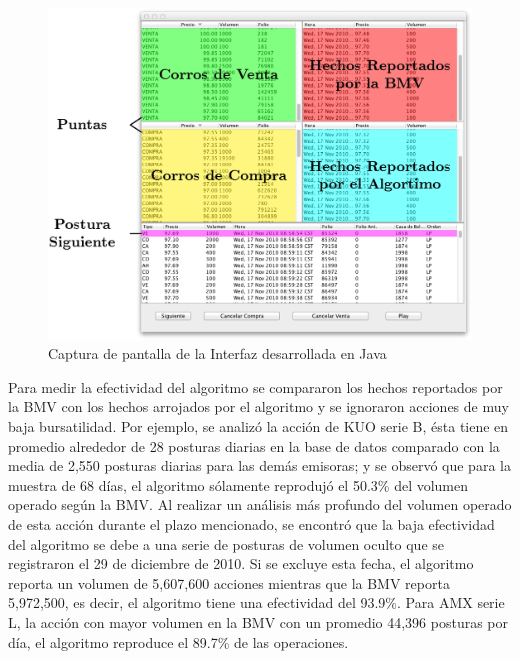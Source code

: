 \documentclass[11pt]{article}
\numberwithin{equation}{section} %
\begin{document}
\begin{landscape}

\begin{figure}[htbp] \centering
\includegraphics{screenshot.png}
\caption{Captura de pantalla de la Interfaz desarrollada en Java}
\label{java}
\end{figure}

\end{landscape}

Para medir la efectividad del algoritmo se compararon los hechos reportados por la BMV con los hechos arrojados por el algoritmo y se ignoraron acciones de muy baja bursatilidad. Por ejemplo, se analizó la acción de KUO serie B, ésta tiene en promedio alrededor de 28 posturas diarias en la base de datos comparado con la media de 2,550 posturas diarias para las demás emisoras; y se observó que para la muestra de 68 días, el algoritmo sólamente reprodujó el 50.3\% del volumen operado según la BMV. Al realizar un análisis más profundo del volumen operado de esta acción durante el plazo mencionado, se encontró que la baja efectividad del algoritmo se debe a una serie de posturas de volumen oculto que se registraron el 29 de diciembre de 2010. Si se excluye esta fecha, el algoritmo reporta un volumen de 5,607,600 acciones mientras que la BMV reporta 5,972,500, es decir, el algoritmo tiene una efectividad del 93.9\%. Para AMX serie L, la acción con mayor volumen en la BMV con un promedio 44,396 posturas por día, el algoritmo reproduce el 89.7\% de las operaciones.\\
\end{document}
